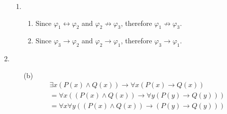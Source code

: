 \documentclass[fleqn]{article}
\begin{document}
\begin{enumerate}
\begin{enumerate}
		\item %
		\begin{enumerate}
			\item %
			Since \(\varphi_1 \leftrightarrow \varphi_2\) and \(\varphi_2 \not\to \varphi_3\), therefore \(\varphi_1 \not\to \varphi_3\).
			\item %
			Since \(\varphi_3 \to \varphi_2\) and \(\varphi_2 \to \varphi_1\), therefore \(\varphi_3 \to \varphi_1\).
		\end{enumerate}
	\end{enumerate}

	\item %
	\begin{enumerate}
		\item[(b)]
		\begin{gather*}
			\exists x (P(x) \land Q(x)) \to \forall x (P(x) \to Q(x)) \\
			= \forall x ((P(x) \land Q(x)) \to \forall y (P(y) \to Q(y))) \\
			= \forall x \forall y ((P(x) \land Q(x)) \to (P(y) \to Q(y)))
		\end{gather*}
	\end{enumerate}


\end{enumerate}
\end{document}
